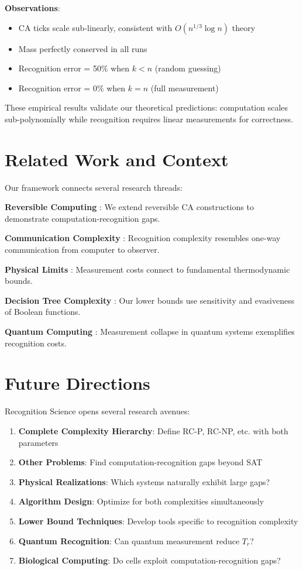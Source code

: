 \documentclass[11pt]{article}
\theoremstyle{plain}
\theoremstyle{definition}
\theoremstyle{remark}
\begin{document}
\textbf{Observations}:
\begin{itemize}
\item CA ticks scale sub-linearly, consistent with $O(n^{1/3} \log n)$ theory
\item Mass perfectly conserved in all runs
\item Recognition error = 50\% when $k < n$ (random guessing)
\item Recognition error = 0\% when $k = n$ (full measurement)
\end{itemize}

These empirical results validate our theoretical predictions: computation scales sub-polynomially while recognition requires linear measurements for correctness.

\section{Related Work and Context}

Our framework connects several research threads:

\textbf{Reversible Computing} \cite{fredkin1982conservative,toffoli1977computation}: We extend reversible CA constructions to demonstrate computation-recognition gaps.

\textbf{Communication Complexity} \cite{yao1977probabilistic,kushilevitz1997communication}: Recognition complexity resembles one-way communication from computer to observer.

\textbf{Physical Limits} \cite{landauer1961irreversibility,bennett1973logical}: Measurement costs connect to fundamental thermodynamic bounds.

\textbf{Decision Tree Complexity} \cite{buhrman2002complexity}: Our lower bounds use sensitivity and evasiveness of Boolean functions.

\textbf{Quantum Computing} \cite{nielsen2010quantum}: Measurement collapse in quantum systems exemplifies recognition costs.

\section{Future Directions}

Recognition Science opens several research avenues:

\begin{enumerate}
\item \textbf{Complete Complexity Hierarchy}: Define RC-P, RC-NP, etc. with both parameters
\item \textbf{Other Problems}: Find computation-recognition gaps beyond SAT
\item \textbf{Physical Realizations}: Which systems naturally exhibit large gaps?
\item \textbf{Algorithm Design}: Optimize for both complexities simultaneously
\item \textbf{Lower Bound Techniques}: Develop tools specific to recognition complexity
\item \textbf{Quantum Recognition}: Can quantum measurement reduce $T_r$?
\item \textbf{Biological Computing}: Do cells exploit computation-recognition gaps?
\end{enumerate}
\end{document}
